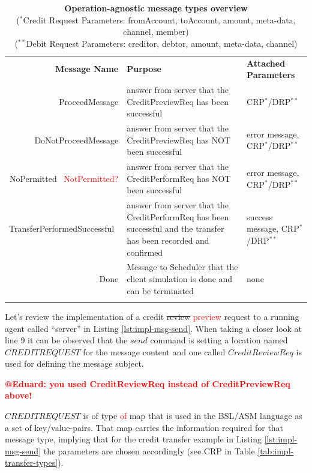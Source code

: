 \setlength{\tabcolsep}{6pt}
\begin{table}[H]
\begin{centering}
\small
{
\begin{tabular}{ r | p{6.7cm} | p{4.4cm} }
\hline
\textbf{Message Name} & \textbf{Purpose} & \textbf{Attached Parameters} \\
\Xhline{1.5pt}
ProceedMessage & answer from server that the CreditPreviewReq has been successful & CRP$^{*}$/DRP$^{**}$\\[3pt]
\hline
DoNotProceedMessage & answer from server that the CreditPreviewReq has NOT  been successful & error message, CRP$^{*}$/DRP$^{**}$\\[3pt]
\hline
NoPermitted \ \textcolor{red}{NotPermitted?} & answer from server that the CreditPerformReq has NOT been successful & error message, CRP$^{*}$/DRP$^{**}$ \\[3pt]
\hline
TransferPerformedSuccessful\ & answer from server that the CreditPerformReq has been successful and the transfer has been recorded and confirmed & success message, CRP$^{*}$/DRP$^{**}$ \\[3pt]
\hline
Done & Message to Scheduler that the client simulation is done and can be terminated & none \\[3pt]
\Xhline{1.5pt}
\end{tabular}
}
\caption{\small\textbf{Operation-agnostic message types overview}\\
($^{*}$Credit Request Parameters: fromAccount, toAccount, amount, meta-data, channel, member)\\
($^{**}$Debit Request Parameters:  creditor, debtor, amount, meta-data, channel)}
\label{tab:impl-msg-generic-types}
\end{centering}
\vspace{-1cm}
\end{table}

Let's review the implementation of a credit \st{review} \textcolor{red}{preview} request to a running agent called ``server'' in Listing \ref{lst:impl-msg-send}. When taking a closer look at line 9 it can be observed that the $send$ command is setting a location named $CREDITREQUEST$ for the message content and one called $CreditReviewReq$ is used for defining the message subject.

\textcolor{red}{\bf @Eduard: you used CreditReviewReq  instead of CreditPreviewReq above!} 

$CREDITREQUEST$ is of type \textcolor{red}{of} map that is used in the BSL/ASM language as a set of key/value-pairs. That map carries the information required for that message type, implying that for the credit transfer example in Listing \ref{lst:impl-msg-send} the parameters are chosen accordingly (see CRP in Table \ref{tab:impl-transfer-types}).

